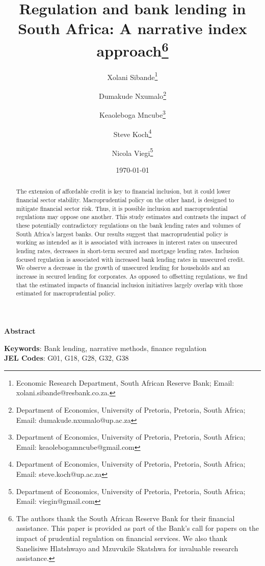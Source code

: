 \title{Regulation and bank lending in South Africa: A narrative index approach\thanks{The authors thank the South African Reserve Bank for their financial assistance. This paper is provided as part of the Bank's call for papers on the impact of prudential regulation on financial services. We also thank Sanelisiwe Hlatshwayo and Mzuvukile Skatshwa for invaluable research assistance.}}

\author {Xolani Sibande\footnote{Economic Research Department, South African Reserve Bank; Email: xolani.sibande@resbank.co.za.} \and
Dumakude Nxumalo\footnote{Department of Economics, University of Pretoria, Pretoria, South Africa; Email: dumakude.nxumalo@up.ac.za} \and
Keaoleboga Mncube\footnote{Department of Economics, University of Pretoria, Pretoria, South Africa; Email: keaolebogamncube@gmail.com} \and
Steve Koch\footnote{Department of Economics, University of Pretoria, Pretoria, South Africa; Email: steve.koch@up.ac.za} \and
Nicola Viegi\footnote{Department of Economics, University of Pretoria, Pretoria, South Africa; Email: viegin@gmail.com}}

\date{\today}
\maketitle

\begin{center}
\textbf{Abstract}
\end{center}

\begin{abstract}
The extension of affordable credit is key to financial inclusion, but it could lower financial sector stability. Macroprudential policy on the other hand, is designed to mitigate financial sector risk. Thus, it is possible inclusion and macroprudential regulations may oppose one another. This study estimates and contrasts the impact of these potentially contradictory regulations on the bank lending rates and volumes of South Africa's largest banks. Our results suggest that macroprudential policy is working as intended as it is associated with increases in interest rates on unsecured lending rates, decreases in short-term secured and mortgage lending rates.  Inclusion focused regulation is associated with increased bank lending rates in unsecured credit. We observe a decrease in the growth of unsecured lending for households and an increase in secured lending for corporates. As opposed to offsetting regulations, we find that the estimated impacts of financial inclusion initiatives largely overlap with those estimated for macroprudential policy.
\end{abstract}


\noindent\textbf{Keywords}: Bank lending, narrative methods, finance regulation\\
\textbf{JEL Codes}: G01, G18, G28, G32, G38
\newpage